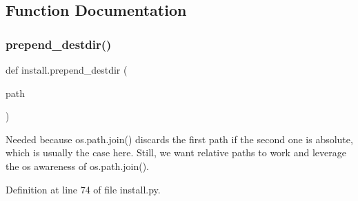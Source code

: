 \subsection{Function Documentation}
\mbox{\label{namespaceinstall_a7d13e721d8f29c6b97f38106bd003838}} 
\subsubsection{\texorpdfstring{prepend\+\_\+destdir()}{prepend\_destdir()}}
{\footnotesize\ttfamily def install.\+prepend\+\_\+destdir (\begin{DoxyParamCaption}\item[{}]{path }\end{DoxyParamCaption})}

\begin{DoxyVerb}Needed because os.path.join() discards the first path if the
second one is absolute, which is usually the case here. Still, we
want relative paths to work and leverage the os awareness of
os.path.join().
\end{DoxyVerb}
 

Definition at line 74 of file install.\+py.

